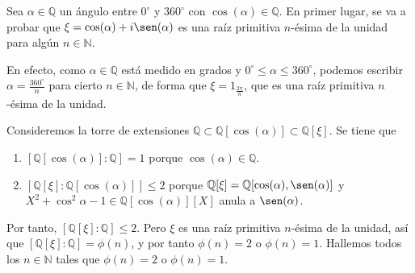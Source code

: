 \documentclass[11pt]{report}
\makeatletter
\renewenvironment{proof}[1][\proofname]{\par
  \pushQED{\qed}%
  \normalfont \topsep\z@skip %
  \trivlist
  \item[\hskip\labelsep
        \itshape
    #1\@addpunct{.}]\ignorespaces
}{%
  \popQED\endtrivlist\@endpefalse
}
\newcommand{\N}{\mathbb N}
\newcommand{\Q}{\mathbb Q}
\makeatother
\begin{document}
    \begin{proof}
    Sea $\alpha \in \Q$ un ángulo entre $0^\circ$ y $360^\circ$ con $\cos(\alpha) \in \Q$. En primer lugar, se va a probar que $\xi = \cos(\alpha)+i\sen(\alpha)$ es una raíz primitiva $n$-ésima de la unidad para algún $n \in \N$.
    
    En efecto, como $\alpha \in \Q$ está medido en grados y $0^\circ \leq \alpha \leq 360^\circ$, podemos escribir $\alpha = \frac{360^\circ}{n}$ para cierto $n \in \N$, de forma que $\xi = 1_{\frac{2\pi}{n}}$, que es una raíz primitiva $n$-ésima de la unidad.
    
    Consideremos la torre de extensiones $\Q \subset \Q[\cos(\alpha)] \subset \Q[\xi]$. Se tiene que
    \begin{enumerate}
        \item $[\Q[\cos(\alpha)] \colon \Q] = 1$ porque $\cos(\alpha) \in \Q$.
        \item $[\Q[\xi] \colon \Q[\cos(\alpha)]] \leq 2$ porque $\Q[\xi] = \Q[\cos(\alpha),\sen(\alpha)]$ y $X^2+\cos^2\alpha-1 \in \Q[\cos(\alpha)][X]$ anula a $\sen(\alpha)$.
    \end{enumerate}
    Por tanto, $[\Q[\xi] \colon \Q] \leq 2$. Pero $\xi$ es una raíz primitiva $n$-ésima de la unidad, así que $[\Q[\xi] \colon \Q] = \phi(n)$, y por tanto $\phi(n) = 2$ o $\phi(n)=1$. Hallemos todos los $n \in \N$ tales que $\phi(n) = 2$ o $\phi(n)=1$.
    

\end{proof}
\end{document}
